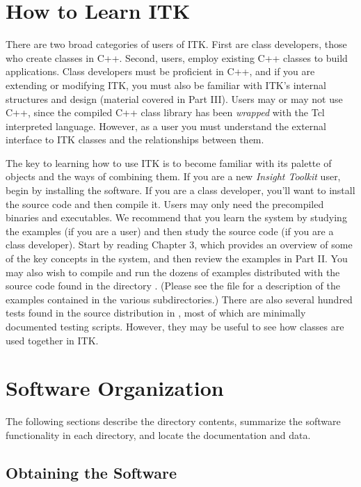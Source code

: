 \section{How to Learn ITK}
\label{sec:HowToLearnITK}

There are two broad categories of users of ITK. First are class developers,
those who create classes in C++. Second, users, employ existing C++ classes
to build applications. Class developers must be proficient in C++, and if you
are extending or modifying ITK, you must also be familiar with ITK's internal
structures and design (material covered in Part III). Users may or may not
use C++, since the compiled C++ class library has been \emph{wrapped} with
the Tcl interpreted language. However, as a user you must understand the
external interface to ITK classes and the relationships between them.

The key to learning how to use ITK is to become familiar with its palette of
objects and the ways of combining them. If you are a new \emph{Insight
Toolkit} user, begin by installing the software. If you are a class
developer, you'll want to install the source code and then compile it. Users
may only need the precompiled binaries and executables. We recommend that you
learn the system by studying the examples (if you are a user) and then study
the source code (if you are a class developer). Start by reading Chapter 3,
which provides an overview of some of the key concepts in the system, and
then review the examples in Part II. You may also wish to compile and run the
dozens of examples distributed with the source code found in the directory
. (Please see the file 
 for
a description of the examples contained in the various subdirectories.) There
are also several hundred tests found in the source distribution in 
, most of which are minimally documented
testing scripts. However, they may be useful to see how classes are used
together in ITK.

\section{Software Organization}
\label{sec:SoftwareOrganization}

The following sections describe the directory contents, summarize the
software functionality in each directory, and locate the documentation and
data.

\subsection{Obtaining the Software}
\label{sec:ObtainingTheSoftware}

